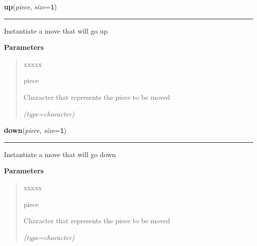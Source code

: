 \hspace{.8\funcindent}\begin{boxedminipage}{\funcwidth}

    \raggedright \textbf{up}(\textit{piece}, \textit{size}={\tt 1})

    \vspace{-1.5ex}

    \rule{\textwidth}{0.5\fboxrule}
\setlength{\parskip}{2ex}
    Instantiate a move that will go up

\setlength{\parskip}{1ex}
      \textbf{Parameters}
      \vspace{-1ex}

      \begin{quote}
        \begin{Ventry}{xxxxx}

          \item[piece]

          Character that represents the piece to be moved

            {\it (type=character)}

        \end{Ventry}

      \end{quote}

    \end{boxedminipage}

    \label{UnBlockMeSolver:Map:Move:Move:down}

    \vspace{0.5ex}

\hspace{.8\funcindent}\begin{boxedminipage}{\funcwidth}

    \raggedright \textbf{down}(\textit{piece}, \textit{size}={\tt 1})

    \vspace{-1.5ex}

    \rule{\textwidth}{0.5\fboxrule}
\setlength{\parskip}{2ex}
    Instantiate a move that will go down

\setlength{\parskip}{1ex}
      \textbf{Parameters}
      \vspace{-1ex}

      \begin{quote}
        \begin{Ventry}{xxxxx}

          \item[piece]

          Character that represents the piece to be moved

            {\it (type=character)}

        \end{Ventry}

      \end{quote}

    \end{boxedminipage}


